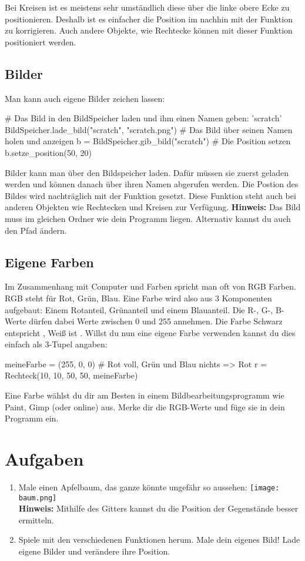 \documentclass{\VorlagenPfad/coderdojokatext}
\begin{document}
Bei Kreisen ist es meistens sehr umständlich diese über die linke obere Ecke zu positionieren. Deshalb ist es einfacher die Position im nachhin mit der Funktion  zu korrigieren. Auch andere Objekte, wie Rechtecke können mit dieser Funktion positioniert werden.

\subsection{Bilder}
Man kann auch eigene Bilder zeichen lassen:
\begin{pythoncode}
# Das Bild in den BildSpeicher laden und ihm einen Namen geben: 'scratch' 
BildSpeicher.lade_bild("scratch", "scratch.png")
# Das Bild über seinen Namen holen und anzeigen
b = BildSpeicher.gib_bild("scratch")
# Die Position setzen
b.setze_position(50, 20)
\end{pythoncode}
Bilder kann man über den Bildspeicher laden. Dafür müssen sie zuerst geladen werden und können danach über ihren Namen abgerufen werden. Die Postion des Bildes wird nachträglich mit der Funktion  gesetzt. Diese Funktion steht auch bei anderen Objekten wie Rechtecken und Kreisen zur Verfügung.
\textbf{Hinweis:} Das Bild muss im gleichen Ordner wie dein Programm liegen. Alternativ kannst du auch den Pfad  ändern.

\subsection{Eigene Farben}
Im Zusammenhang mit Computer und Farben spricht man oft von RGB Farben. RGB steht für Rot, Grün, Blau. Eine Farbe wird also aus 3 Komponenten aufgebaut: Einem Rotanteil, Grünanteil und einem Blauanteil. Die R-, G-, B-Werte dürfen dabei Werte zwischen 0 und 255 annehmen. Die Farbe Schwarz entspricht , Weiß ist . 
Willst du nun eine eigene Farbe verwenden kannst du dies einfach als 3-Tupel angaben:

\begin{pythoncode}
meineFarbe = (255, 0, 0) # Rot voll, Grün und Blau nichts => Rot
r = Rechteck(10, 10, 50, 50, meineFarbe)
\end{pythoncode}
Eine Farbe wählst du dir am Besten in einem Bildbearbeitungsprogramm wie Paint, Gimp (oder online) aus. Merke dir die RGB-Werte und füge sie in dein Programm ein.
\section{Aufgaben}
\begin{enumerate}
\item Male einen Apfelbaum, das ganze könnte ungefähr so aussehen:
\texttt{[image: baum.png]}	
\\\textbf{Hinweis:} Mithilfe des Gitters kannst du die Position der Gegenstände besser ermitteln.

\item Spiele mit den verschiedenen Funktionen herum. Male dein eigenes Bild! Lade eigene Bilder und verändere ihre Position.
\end{enumerate}
\end{document}
